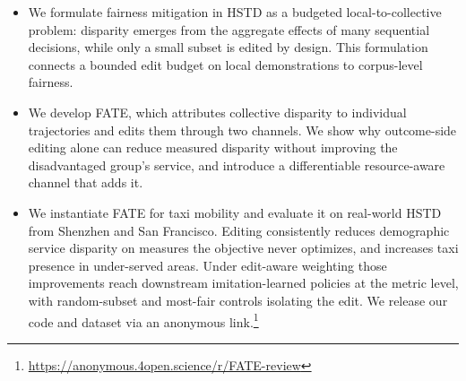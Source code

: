 \begin{itemize}
\item We formulate fairness mitigation in HSTD as a budgeted
local-to-collective problem: disparity emerges from the aggregate effects of
many sequential decisions, while only a small subset is edited by design.
This formulation connects a bounded edit budget on local demonstrations to 
corpus-level fairness.
\item We develop FATE, which attributes collective disparity to individual 
trajectories and edits them through two channels. We show why outcome-side 
editing alone can reduce measured disparity without improving the 
disadvantaged group's service, and introduce a differentiable resource-aware 
channel that adds it.
\item We instantiate FATE for taxi mobility and evaluate it on real-world HSTD 
from Shenzhen and San Francisco. Editing consistently reduces demographic 
service disparity on measures the objective never optimizes, and increases 
taxi presence in under-served areas. Under edit-aware weighting those 
improvements reach downstream imitation-learned policies at the metric level, 
with random-subset and most-fair controls isolating the edit. We release our 
code and dataset via an anonymous link.\footnote{\url{https://anonymous.4open.science/r/FATE-review}
}
\end{itemize}
